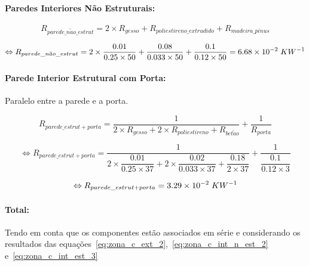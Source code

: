 \documentclass[12pt, a4paper]{article}
\begin{document}

\paragraph{Paredes Interiores Não Estruturais:}\label{par:zona_c_int_n_est}

\begin{equation}
	R_{parede\_n\tilde{a}o\_estrut} = 2 \times R_{gesso} + R_{poliestireno\_extrudido} + R_{madeira\_pinus}
	\label{eq:zona_c_int_n_est_1}
\end{equation}

\begin{equation}
	\Leftrightarrow R_{parede\_n\tilde{a}o\_estrut} =
	2 \times \dfrac{0.01}{0.25 \times 50} +
	\dfrac{0.08}{0.033 \times 50} +
	\dfrac{0.1}{0.12 \times 50} = 6.68 \times 10^{-2} \hspace{1mm} KW^{-1}
	\label{eq:zona_c_int_n_est_2}
\end{equation}

\paragraph{Parede Interior Estrutural com Porta:}\label{par:zona_c_int_est}Paralelo entre a parede e a porta.

\begin{equation}
	R_{parede\_estrut + porta} =
	\dfrac{1}{
		2 \times R_{gesso} + 2 \times R_{poliestireno} + R_{bet\tilde{a}o}
	}
	+
	\dfrac{1}{
		R_{porta}
	}
	\label{eq:zona_c_int_est_1}
\end{equation}

\begin{equation}
	\Leftrightarrow R_{parede\_estrut + porta} =
	\dfrac{1}{
		2 \times \dfrac{0.01}{0.25 \times 37} +
		2 \times \dfrac{0.02}{0.033 \times 37} +
		\dfrac{0.18}{2 \times 37}
	}
	+
	\dfrac{1}{
		\dfrac{0.1}{0.12 \times 3}
	}
	\label{eq:zona_c_int_est_2}
\end{equation}

\begin{equation}
	\Leftrightarrow R_{parede\_estrut + porta} = 3.29 \times 10^{-2} \hspace{1mm} KW^{-1}
	\label{eq:zona_c_int_est_3}
\end{equation}

\paragraph{Total:}\label{par:zona_c_total:} Tendo em conta que os componentes est\~ao
associados em série e considerando os resultados das
equa\c{c}\~oes~\ref{eq:zona_c_ext_2},~\ref{eq:zona_c_int_n_est_2} e~\ref{eq:zona_c_int_est_3}
\end{document}
